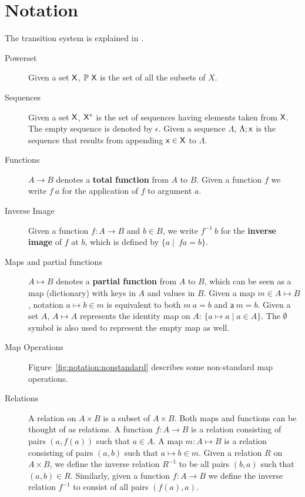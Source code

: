 \section{Notation}
\label{sec:notation-shelley}

The transition system is explained in \cite{small_step_semantics}.

\begin{description}
  \item[Powerset] Given a set $\mathsf{X}$, $\mathbb{P}~\mathsf{X}$ is the set of all
    the subsets of $X$.
  \item[Sequences] Given a set $\mathsf{X}$, $\mathsf{X}^{*}$ is the set of
    sequences having elements taken from $\mathsf{X}$. The empty sequence is
    denoted by $\epsilon$. Given a sequence $\Lambda$, $\Lambda; \mathsf{x}$ is
    the sequence that results from appending $\mathsf{x} \in \mathsf{X}$ to
    $\Lambda$.
  \item[Functions] $A \to B$ denotes a \textbf{total function} from $A$ to $B$.
    Given a function $f$ we write $f~a$ for the application of $f$ to argument
    $a$.
  \item[Inverse Image] Given a function $f: A \to B$ and $b\in B$, we write
    $f^{-1}~b$ for the \textbf{inverse image} of $f$ at $b$, which is defined by
    $\{a \mid\ f a =  b\}$.
  \item[Maps and partial functions] $A \mapsto B$ denotes a \textbf{partial
    function} from $A$ to $B$, which can be seen as a map (dictionary) with
    keys in $A$ and values in $B$. Given a map $m \in A \mapsto B$, notation
    $a \mapsto b \in m$ is equivalent to both $m~ a = b$ and $\mathsf{a}~m = b$.
    Given a set $A$, $A \mapsto A$ represents the identity map on $A$:
    $\{a \mapsto a \mid a \in A\}$. The $\emptyset$ symbol is also used to
    represent the empty map as well.
  \item[Map Operations] Figure~\ref{fig:notation:nonstandard}
    describes some non-standard map operations.
  \item[Relations] A relation on $A\times B$ is a subset of $A\times B$.
    Both maps and functions can be thought of as relations.
    A function $f:A\to B$ is a relation consisting of pairs $(a, f(a))$ such that $a\in A$.
    A map $m: A\mapsto B$ is a relation consisting of pairs $(a, b)$ such that
    $a\mapsto b \in m$.
    Given a relation $R$ on $A\times B$, we define the inverse relation $R^{-1}$ to be
    all pairs $(b, a)$ such that $(a, b)\in R$. Similarly, given a function $f:A\to B$ we
    define the inverse relation $f^{-1}$ to consist of all pairs $(f(a), a)$.

\end{description}
